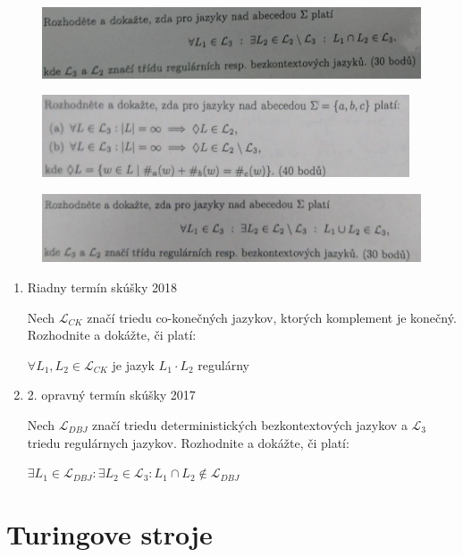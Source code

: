 \documentclass[]{article}
\begin{document}
	\begin{figure}[H]
		\includegraphics[width=\textwidth]{tasks/vlastnosti/task2.png}
	\end{figure}
	
	\begin{figure}[H]
		\includegraphics[width=\textwidth]{tasks/vlastnosti/task3.png}
	\end{figure}


	\begin{figure}[H]
		\includegraphics[width=\textwidth]{tasks/vlastnosti/task4.png}
	\end{figure}

	\begin{enumerate}
		\item Riadny termín skúšky 2018
		
		Nech $\mathcal{L}_{CK}$ značí triedu co-konečných jazykov, ktorých komplement je konečný. Rozhodnite a dokážte, či platí:
		
		$\forall L_1, L_2 \in \mathcal{L}_{CK}$ je jazyk $L_1 \cdot L_2$ regulárny
		
		\item 2. opravný termín skúšky 2017
		
		Nech $\mathcal{L}_{DBJ}$ značí triedu deterministických bezkontextových jazykov a $\mathcal{L}_{3}$ triedu regulárnych jazykov. Rozhodnite a dokážte, či platí:
		
		$\exists L_1 \in \mathcal{L}_{DBJ}: \exists L_2 \in \mathcal{L}_{3}: L_1 \cap L_2 \notin \mathcal{L}_{DBJ}$
	\end{enumerate}
	\section{Turingove stroje}
	
\end{document}
